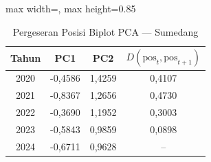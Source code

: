 \begin{table}[H]
\centering
\caption{Pergeseran Posisi Biplot PCA --- Sumedang} \label{tab:appjarak_pca_skor_sumedang}
\begin{adjustbox}{max width=\textwidth, max height=0.85\textheight}
\begin{tabular}{|c|c|c|c|}
\hline
\textbf{Tahun} & \textbf{PC1} & \textbf{PC2} & \textbf{$D(\text{pos}_t, \text{pos}_{t+1})$} \\
\hline
2020 & -0,4586 & 1,4259 & 0,4107 \\
2021 & -0,8367 & 1,2656 & 0,4730 \\
2022 & -0,3690 & 1,1952 & 0,3003 \\
2023 & -0,5843 & 0,9859 & 0,0898 \\
2024 & -0,6711 & 0,9628 & -- \\
\hline
\end{tabular}
\end{adjustbox}
\end{table}